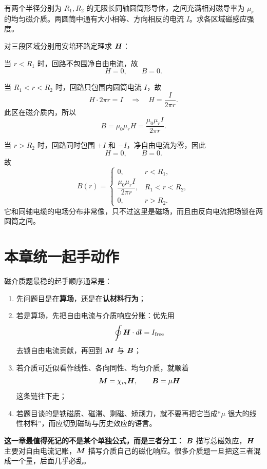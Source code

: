 \documentclass[lang=cn,11pt]{elegantbook}
\begin{document}
\begin{example}[两同轴反向电流圆筒间的磁场]
有两个半径分别为 \(R_1,R_2\) 的无限长同轴圆筒形导体，之间充满相对磁导率为 \(\mu_r\) 的均匀磁介质。两圆筒中通有大小相等、方向相反的电流 \(I\)。求各区域磁感应强度。
\end{example}

\begin{solution}
对三段区域分别用安培环路定理求 \(\vb*{H}\)：

当 \(r<R_1\) 时，回路不包围净自由电流，故
\[
H=0,\qquad B=0.
\]

当 \(R_1<r<R_2\) 时，回路只包围内圆筒电流 \(I\)，故
\[
H\cdot 2\pi r=I
\quad\Longrightarrow\quad
H=\frac{I}{2\pi r}.
\]
此区在磁介质内，所以
\[
B=\mu_0\mu_r H
=\frac{\mu_0\mu_r I}{2\pi r}.
\]

当 \(r>R_2\) 时，回路同时包围 \(+I\) 和 \(-I\)，净自由电流为零，因此
\[
H=0,\qquad B=0.
\]
故
\[
\boxed{
B(r)=
\begin{cases}
0, & r<R_1,\\[4pt]
\dfrac{\mu_0\mu_r I}{2\pi r}, & R_1<r<R_2,\\[6pt]
0, & r>R_2.
\end{cases}}
\]
它和同轴电缆的电场分布非常像，只不过这里是磁场，而且由反向电流把场锁在两圆筒之间。
\end{solution}

\section{本章统一起手动作}

磁介质题最稳的起手顺序通常是：
\begin{enumerate}
  \item 先问题目是在\textbf{算场}，还是在\textbf{认材料行为}；
  \item 若是算场，先把自由电流与介质响应分账：优先用
  \[
  \oint \vb*{H}\cdot d\vb*{l}=I_{\mathrm{free}}
  \]
  去锁自由电流贡献，再回到 \(\vb*{M}\) 与 \(\vb*{B}\)；
  \item 若介质可近似看作线性、各向同性、均匀介质，就顺着
  \[
  \vb*{M}=\chi_m\vb*{H},
  \qquad
  \vb*{B}=\mu\vb*{H}
  \]
  这条链往下走；
  \item 若题目谈的是铁磁质、磁滞、剩磁、矫顽力，就不要再把它当成“\(\mu\) 很大的线性材料”，而应切到磁畴与历史效应的语言。
\end{enumerate}

\begin{note}
\textbf{这一章最值得死记的不是某个单独公式，而是三者分工：} \(\vb*{B}\) 描写总磁效应，\(\vb*{H}\) 主要对自由电流记账，\(\vb*{M}\) 描写介质自己的磁化响应。很多介质题一旦把这三者混成一个量，后面几乎必乱。
\end{note}
\end{document}
